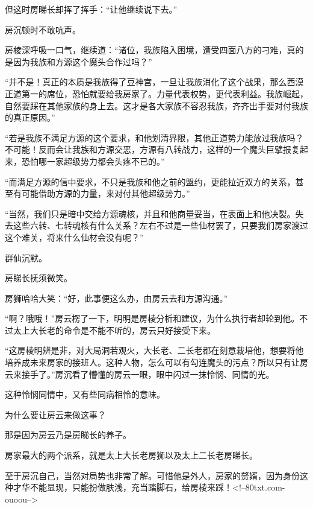 \begin{this_body}
但这时房睇长却挥了挥手：“让他继续说下去。”

房沉顿时不敢吭声。

房棱深呼吸一口气，继续道：“诸位，我族陷入困境，遭受四面八方的刁难，真的是因为我族和方源这个魔头合作过吗？”

“并不是！真正的本质是我族得了豆神宫，一旦让我族消化了这个战果，那么西漠正道第一的席位，恐怕就要给我房家了。力量代表权势，更代表利益。我族崛起，自然要踩在其他家族的身上去。这才是各大家族不容忍我族，齐齐出手要对付我族的真正原因。”

“若是我族不满足方源的这个要求，和他划清界限，其他正道势力能放过我族吗？不可能！反而会让我族和方源交恶，方源有八转战力，这样的一个魔头巨擘报复起来，恐怕哪一家超级势力都会头疼不已的。”

“而满足方源的信中要求，不只是我族和他之前的盟约，更能拉近双方的关系，甚至有可能借助方源的力量，来对付其他超级势力。”

“当然，我们只是暗中交给方源魂核，并且和他商量妥当，在表面上和他决裂。失去这些六转、七转魂核有什么关系？左右不过是一些仙材罢了，只要我们房家渡过这个难关，将来什么仙材会没有呢？”

群仙沉默。

房睇长抚须微笑。

房狮哈哈大笑：“好，此事便这么办，由房云去和方源沟通。”

“啊？哦哦！”房云楞了一下，明明是房棱分析和建议，为什么执行者却轮到他。不过太上大长老的命令是不能不听的，房云只好接受下来。

“这房棱明辨是非，对大局洞若观火，大长老、二长老都在刻意栽培他，想要将他培养成未来房家的接班人。这种人物，怎么可以有勾连魔头的污点？所以只有让房云来接手了。”房沉看了懵懂的房云一眼，眼中闪过一抹怜悯、同情的光。

这种怜悯同情中，又有些同病相怜的意味。

为什么要让房云来做这事？

那是因为房云乃是房睇长的养子。

房家最大的两个派系，就是太上大长老房狮以及太上二长老房睇长。

至于房沉自己，当然对局势也非常了解。可惜他是外人，房家的赘婿，因为身份这种才华不能显现，只能扮做肤浅，充当踏脚石，给房棱来踩！<!--80txt.com-ouoou-->

\end{this_body}

